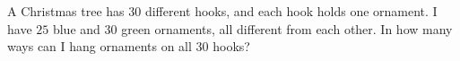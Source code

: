 A Christmas tree has $30$ different hooks, and each hook holds one ornament. I have $25$ blue and $30$ green ornaments, all different from each other. In how many ways can I hang ornaments on all $30$ hooks?
